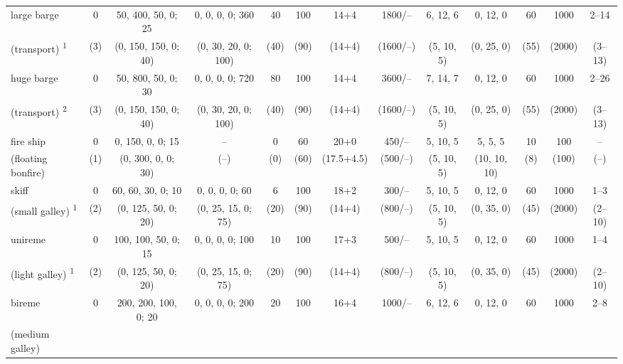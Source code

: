 \documentclass{article}
\begin{document}
\begin{landscape}
\begin{tabular}{l|ccc|ccccc|cccc}
\hline %
large barge           &  0  &   50, 400,  50,   0; 25  &  0,  0,  0,  0;  360  &   40  &  100  &    14+4    &  1800/--  &   6, 12,  6  &    0,  12,   0  &  60  &  1000  &  2--14  \\ (transport)
\textsuperscript{1}   & (3) &   (0, 150, 150,   0; 40) & (0, 30, 20,  0;  100) &  (40) &  (90) &   (14+4)   & (1600/--) &  (5, 10,  5) &   (0,  25,   0) & (55) & (2000) & (3--13) \\ 
\hline %
huge barge            &  0  &   50, 800,  50,   0; 30  &  0,  0,  0,  0;  720  &   80  &  100  &    14+4    &  3600/--  &   7, 14,  7  &    0,  12,   0  &  60  &  1000  &  2--26  \\ (transport)
\textsuperscript{2}   & (3) &   (0, 150, 150,   0; 40) & (0, 30, 20,  0;  100) &  (40) &  (90) &   (14+4)   & (1600/--) &  (5, 10,  5) &   (0,  25,   0) & (55) & (2000) & (3--13) \\ 
\hline %
fire ship             &  0  &    0, 150,   0,   0; 15  &           --          &    0  &   60  &    20+0    &   450/--  &   5, 10,  5  &    5,   5,   5  &  10  &   100  &   --    \\ (floating bonfire)
                      & (1) &   (0, 300,   0,   0; 30) &          (--)         &   (0) &  (60) & (17.5+4.5) &  (500/--) &  (5, 10,  5) &  (10,  10,  10) &  (8) &  (100) &  (--)   \\ %
\hline %
skiff                 &  0  &   60,  60,  30,   0; 10  &  0,  0,  0,  0;   60  &    6  &  100  &    18+2    &   300/--  &   5, 10,  5  &    0,  12,   0  &  60  &  1000  &  1--3   \\ (small galley)
\textsuperscript{1}   & (2) &   (0, 125,  50,   0; 20) & (0, 25, 15,  0;   75) &  (20) &  (90) &   (14+4)   &  (800/--) &  (5, 10,  5) &   (0,  35,   0) & (45) & (2000) & (2--10) \\ 
\hline %
unireme               &  0  &  100, 100,  50,   0; 15  &  0,  0,  0,  0;  100  &   10  &  100  &    17+3    &   500/--  &   5, 10,  5  &    0,  12,   0  &  60  &  1000  &  1--4   \\ (light galley)
\textsuperscript{1}   & (2) &   (0, 125,  50,   0; 20) & (0, 25, 15,  0;   75) &  (20) &  (90) &   (14+4)   &  (800/--) &  (5, 10,  5) &   (0,  35,   0) & (45) & (2000) & (2--10) \\
\hline %
bireme                &  0  &  200, 200, 100,   0; 20  &  0,  0,  0,  0;  200  &   20  &  100  &    16+4    &  1000/--  &   6, 12,  6  &    0,  12,   0  &  60  &  1000  &  2--8   \\ (medium galley)

\end{tabular}
\end{landscape}
\end{document}
